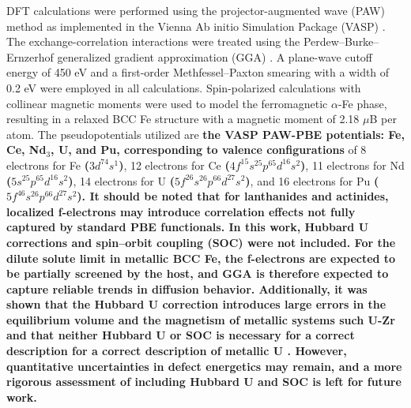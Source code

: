 \documentclass[preprint,12pt]{elsarticle}
\providecommand{\DIFaddtex}[1]{{\bf #1}} %
\providecommand{\DIFdeltex}[1]{} %
\providecommand{\DIFaddbegin}{\protect\color{blue}} %
\providecommand{\DIFaddend}{\protect\color{black}} %
\providecommand{\DIFdelbegin}{\protect\color{red}} %
\providecommand{\DIFdelend}{\protect\color{black}} %
\providecommand{\DIFadd}[1]{\texorpdfstring{\DIFaddtex{#1}}{#1}} %
\providecommand{\DIFdel}[1]{\texorpdfstring{\DIFdeltex{#1}}{}} %
\newcommand{\DIFscaledelfig}{0.5}
\newlength{\DIFdelgraphicswidth} %
\newlength{\DIFdelgraphicsheight} %
\newcommand{\DIFaddincludegraphics}[2][]{{\color{blue}\fbox{\DIFOincludegraphics[#1]{#2}}}} %
\newcommand{\DIFdelincludegraphics}[2][]{%
\sbox{\DIFdelgraphicsbox}{\DIFOincludegraphics[#1]{#2}}%
\settoboxwidth{\DIFdelgraphicswidth}{\DIFdelgraphicsbox} %
\settoboxtotalheight{\DIFdelgraphicsheight}{\DIFdelgraphicsbox} %
\scalebox{\DIFscaledelfig}{%
\parbox[b]{\DIFdelgraphicswidth}{\usebox{\DIFdelgraphicsbox}\\[-\baselineskip] \rule{\DIFdelgraphicswidth}{0em}}\llap{\resizebox{\DIFdelgraphicswidth}{\DIFdelgraphicsheight}{%
\setlength{\unitlength}{\DIFdelgraphicswidth}%
\begin{picture}(1,1)%
\thicklines\linethickness{2pt} %
{\color[rgb]{1,0,0}\put(0,0){\framebox(1,1){}}}%
{\color[rgb]{1,0,0}\put(0,0){\line( 1,1){1}}}%
{\color[rgb]{1,0,0}\put(0,1){\line(1,-1){1}}}%
\end{picture}%
}\hspace*{3pt}}} %
} %
\DeclareRobustCommand{\DIFaddbegin}{\DIFOaddbegin \let\includegraphics\DIFaddincludegraphics} %
\DeclareRobustCommand{\DIFaddend}{\DIFOaddend \let\includegraphics\DIFOincludegraphics} %
\DeclareRobustCommand{\DIFdelbegin}{\DIFOdelbegin \let\includegraphics\DIFdelincludegraphics} %
\DeclareRobustCommand{\DIFdelend}{\DIFOaddend \let\includegraphics\DIFOincludegraphics} %
\begin{document}
\noindent DFT calculations were performed using the projector-augmented wave (PAW) method as implemented in the Vienna Ab initio Simulation Package (VASP) \cite{kresse_ab_1993, kresse_efficient_1996}. The exchange-correlation interactions were treated using the Perdew--Burke--Ernzerhof generalized gradient approximation (GGA) \cite{perdew_generalized_1996}. A plane-wave cutoff energy of 450 eV and a first-order Methfessel--Paxton smearing with a width of 0.2 eV were employed \cite{methfessel_high-precision_1989} in all calculations. Spin-polarized calculations with collinear magnetic moments were used to model the ferromagnetic $\alpha$-Fe phase, resulting in a relaxed BCC Fe structure with a magnetic moment of 2.18 $\mu$B per atom. The pseudopotentials utilized are \DIFdelbegin \DIFdel{those recommended from VASP , with a valence }\DIFdelend \DIFaddbegin \DIFadd{the VASP PAW-PBE potentials: Fe, Ce, Nd$_3$, U, and Pu, corresponding to valence configurations }\DIFaddend of 8 electrons for Fe \DIFaddbegin \DIFadd{($3d^74s^1$)}\DIFaddend , 12 electrons for Ce \DIFaddbegin \DIFadd{($4f^15s^25p^65d^16s^2$)}\DIFaddend , 11 electrons for Nd \DIFaddbegin \DIFadd{($5s^25p^65d^16s^2$)}\DIFaddend , 14 electrons for U \DIFaddbegin \DIFadd{($5f^26s^26p^66d^27s^2$)}\DIFaddend , and 16 electrons for Pu \DIFdelbegin \DIFdel{. 
}\DIFdelend \DIFaddbegin \DIFadd{($5f^46s^26p^66d^27s^2$).
It should be noted that for lanthanides and actinides, localized f-electrons may introduce correlation effects not fully captured by standard PBE functionals. In this work, Hubbard U corrections \cite{dudarev_effect_1997, cococcioni_linear_2005} and spin–orbit coupling (SOC) \cite{steiner_calculation_2016} were not included. For the dilute solute limit in metallic BCC Fe, the f-electrons are expected to be partially screened by the host, and GGA is therefore expected to capture reliable trends in diffusion behavior. Additionally, it was shown that the Hubbard U correction introduces large errors in the equilibrium volume and the magnetism of metallic systems such U-Zr \cite{soderlind_electron_2014, shousha_magnetism_2024} and that neither Hubbard U or SOC is necessary for a correct description for a correct description of metallic U \cite{soderlind_comment_2014}.
However, quantitative uncertainties in defect energetics may remain, and a more rigorous assessment of including Hubbard U and SOC is left for future work.
}\DIFaddend 
\end{document}
